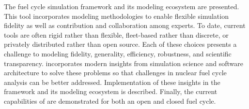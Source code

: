 The \Cyclus fuel cycle simulation framework and its modeling ecosystem are
presented. This tool incorporates modeling methodologies to enable flexible
simulation fidelity as well as contribution and collaboration among experts. To
date, current tools are often rigid rather than flexible, fleet-based rather
than discrete, or privately distributed rather than open source. Each of these
choices presents a challenge to modeling fidelity, generality, efficiency,
robustness, and scientific transparency.  \Cyclus incorporates modern insights
from simulation science and software architecture to solve these problems so
that challenges in nuclear fuel cycle analysis can be better addressed.
Implementation of these insights in the \Cyclus framework and its modeling
ecosystem is described. Finally, the current capabilities of \Cyclus are
demonstrated for both an open and closed fuel cycle.

